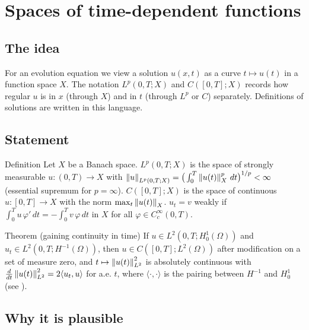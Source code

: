 
\section{Spaces of time-dependent functions}\label{p:bochner-spaces}


\subsection*{The idea}

For an evolution equation we view a solution $u(x,t)$ as a curve $t \mapsto u(t)$ in a function space $X$. The notation $L^p(0,T;X)$ and $C([0,T];X)$ records how regular $u$ is in $x$ (through $X$) and in $t$ (through $L^p$ or $C$) separately. Definitions of solutions are written in this language.

\subsection*{Statement}

\begin{defnbox}{Definition}
%
Let $X$ be a Banach space. $L^p(0,T;X)$ is the space of strongly measurable $u:(0,T)\to X$ with $\left\lVert u\right\rVert_{L^p(0,T;X)} = \big(\int_0^T \left\lVert u(t)\right\rVert_X^p\,dt\big)^{1/p} < \infty$ (essential supremum for $p=\infty$). $C([0,T];X)$ is the space of continuous $u:[0,T]\to X$ with the norm $\max_t \left\lVert u(t)\right\rVert_X$. $u_t = v$ weakly if $\int_0^T u\,\varphi'\,dt = -\int_0^T v\,\varphi\,dt$ in $X$ for all $\varphi\in C_c^\infty(0,T)$.
\end{defnbox}

\begin{thmbox}{Theorem (gaining continuity in time)}
%
If $u \in L^2(0,T;H^1_0(\Omega))$ and $u_t \in L^2(0,T;H^{-1}(\Omega))$, then $u \in C([0,T];L^2(\Omega))$ after modification on a set of measure zero, and $t\mapsto\left\lVert u(t)\right\rVert_{L^2}^2$ is absolutely continuous with $\frac{d}{dt}\left\lVert u(t)\right\rVert_{L^2}^2 = 2\langle u_t, u\rangle$ for a.e. $t$, where $\langle\cdot,\cdot\rangle$ is the pairing between $H^{-1}$ and $H^1_0$ (see ).
\end{thmbox}

\subsection*{Why it is plausible}

